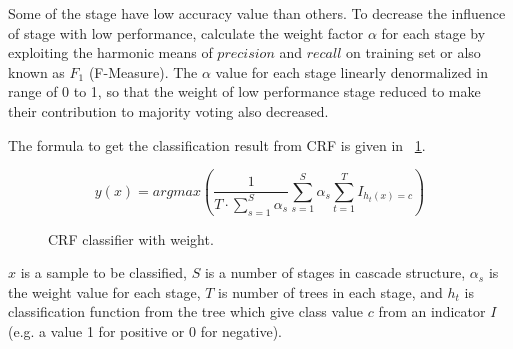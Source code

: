 Some of the stage have low accuracy value than others.
To decrease the influence of stage with low performance, calculate the weight
factor $\alpha$ for each stage by exploiting the harmonic means of $precision$
and $recall$ on training set or also known as $F_1$ (F-Measure).
The $\alpha$ value for each stage linearly denormalized in range of 0 to 1, so
that the weight of low performance stage reduced to make their contribution to
majority voting also decreased.

The formula to get the classification result from CRF is given in
\figurename\ \ref{form:crf}.

\begin{figure}[h]
\[
	y(x) = argmax \left(
			\frac{1}{T \cdot \sum^{S}_{s=1} \alpha_{s} }
			\sum\limits_{s=1}^{S} \alpha_{s}
			\sum\limits^{T}_{t=1} I_{h_{t} (x) = c}
		\right)
\]
\caption{CRF classifier with weight.}
\label{form:crf}
\end{figure}

$x$ is a sample to be classified,
$S$ is a number of stages in cascade structure,
$\alpha_{s}$ is the weight value for each stage,
$T$ is number of trees in each stage, and
$h_{t}$ is classification function from the tree which give class value $c$
from an indicator $I$ (e.g. a value 1 for positive or 0 for negative).
